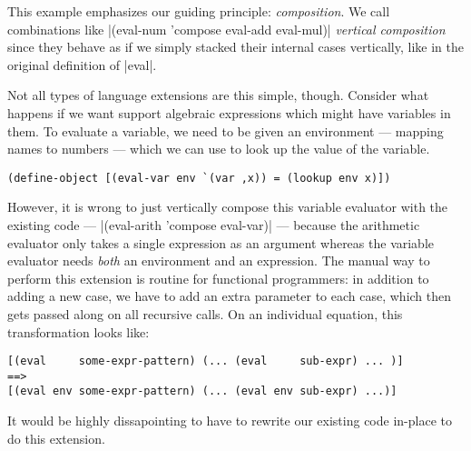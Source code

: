 This example emphasizes our guiding principle: \emph{composition}.
We call combinations like \scm|(eval-num 'compose eval-add eval-mul)| \emph{vertical composition} since they behave as if we simply stacked their internal cases vertically, like in the original definition of \scm|eval|.

Not all types of language extensions are this simple, though.
Consider what happens if we want support algebraic expressions which might have variables in them.
To evaluate a variable, we need to be given an environment --- mapping names to numbers --- which we can use to look up the value of the variable.
\begin{verbatim}
(define-object [(eval-var env `(var ,x)) = (lookup env x)])
\end{verbatim}
However, it is wrong to just vertically compose this variable evaluator with the existing code --- \scm|(eval-arith 'compose eval-var)| --- because the arithmetic evaluator only takes a single expression as an argument whereas the variable evaluator needs \emph{both} an environment and an expression.
The manual way to perform this extension is routine for functional programmers: in addition to adding a new case, we have to add an extra parameter to each case, which then gets passed along on all recursive calls.
On an individual equation, this transformation looks like:
\begin{verbatim}
[(eval     some-expr-pattern) (... (eval     sub-expr) ... )]
==>
[(eval env some-expr-pattern) (... (eval env sub-expr) ...)]
\end{verbatim}
It would be highly dissapointing to have to rewrite our existing code in-place to do this extension.

